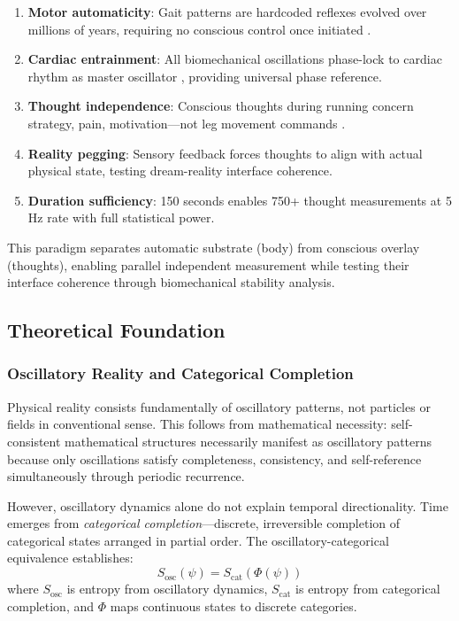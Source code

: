\documentclass[12pt,twocolumn]{article}
\theoremstyle{remark}
\begin{document}
\begin{enumerate}
\item \textbf{Motor automaticity}: Gait patterns are hardcoded reflexes evolved over millions of years, requiring no conscious control once initiated \citep{dietz2002human}.

\item \textbf{Cardiac entrainment}: All biomechanical oscillations phase-lock to cardiac rhythm as master oscillator \citep{sachikonye2024cardiac}, providing universal phase reference.

\item \textbf{Thought independence}: Conscious thoughts during running concern strategy, pain, motivation---not leg movement commands \citep{brick2014thinking}.

\item \textbf{Reality pegging}: Sensory feedback forces thoughts to align with actual physical state, testing dream-reality interface coherence.

\item \textbf{Duration sufficiency}: 150 seconds enables 750+ thought measurements at 5 Hz rate with full statistical power.
\end{enumerate}

This paradigm separates automatic substrate (body) from conscious overlay (thoughts), enabling parallel independent measurement while testing their interface coherence through biomechanical stability analysis.

\subsection{Theoretical Foundation}

\subsubsection{Oscillatory Reality and Categorical Completion}

Physical reality consists fundamentally of oscillatory patterns, not particles or fields in conventional sense. This follows from mathematical necessity: self-consistent mathematical structures necessarily manifest as oscillatory patterns because only oscillations satisfy completeness, consistency, and self-reference simultaneously through periodic recurrence.

However, oscillatory dynamics alone do not explain temporal directionality. Time emerges from \textit{categorical completion}---discrete, irreversible completion of categorical states arranged in partial order. The oscillatory-categorical equivalence establishes:
\begin{equation}
S_{\text{osc}}(\psi) = S_{\text{cat}}(\Phi(\psi))
\end{equation}
where $S_{\text{osc}}$ is entropy from oscillatory dynamics, $S_{\text{cat}}$ is entropy from categorical completion, and $\Phi$ maps continuous states to discrete categories.
\end{document}
